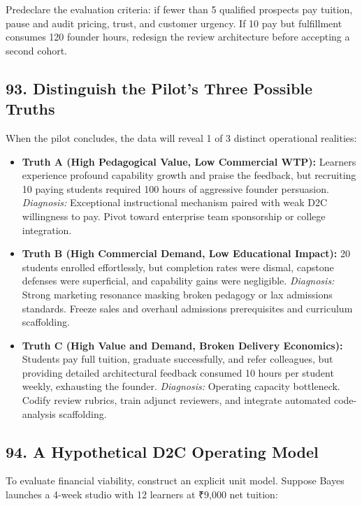 Predeclare the evaluation criteria: if fewer than 5 qualified prospects pay tuition, pause and audit pricing, trust, and customer urgency. If 10 pay but fulfillment consumes 120 founder hours, redesign the review architecture before accepting a second cohort.

\subsection*{93. Distinguish the Pilot's Three Possible Truths}

When the pilot concludes, the data will reveal 1 of 3 distinct operational realities:

\begin{itemize}
    \item \textbf{Truth A (High Pedagogical Value, Low Commercial WTP):} Learners experience profound capability growth and praise the feedback, but recruiting 10 paying students required 100 hours of aggressive founder persuasion. \emph{Diagnosis:} Exceptional instructional mechanism paired with weak D2C willingness to pay. Pivot toward enterprise team sponsorship or college integration.
    \item \textbf{Truth B (High Commercial Demand, Low Educational Impact):} 20 students enrolled effortlessly, but completion rates were dismal, capstone defenses were superficial, and capability gains were negligible. \emph{Diagnosis:} Strong marketing resonance masking broken pedagogy or lax admissions standards. Freeze sales and overhaul admissions prerequisites and curriculum scaffolding.
    \item \textbf{Truth C (High Value and Demand, Broken Delivery Economics):} Students pay full tuition, graduate successfully, and refer colleagues, but providing detailed architectural feedback consumed 10 hours per student weekly, exhausting the founder. \emph{Diagnosis:} Operating capacity bottleneck. Codify review rubrics, train adjunct reviewers, and integrate automated code-analysis scaffolding.
\end{itemize}

\subsection*{94. A Hypothetical D2C Operating Model}

To evaluate financial viability, construct an explicit unit model. Suppose Bayes launches a 4-week studio with 12 learners at ₹9,000 net tuition:

